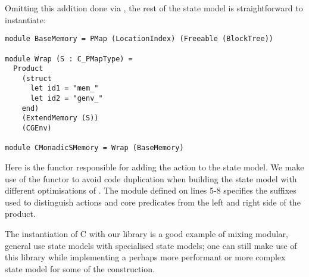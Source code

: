 Omitting this addition done via , the rest of the state model is straightforward to instantiate: \begin{lstlisting}
module BaseMemory = PMap (LocationIndex) (Freeable (BlockTree))

module Wrap (S : C_PMapType) =
  Product
    (struct
      let id1 = "mem_"
      let id2 = "genv_"
    end)
    (ExtendMemory (S))
    (CGEnv)

module CMonadicSMemory = Wrap (BaseMemory)
\end{lstlisting}
Here  is the functor responsible for adding the  action to the state model. We make use of the  functor to avoid code duplication when building the state model with different optimisations of \PMap{}. The module defined on lines 5-8 specifies the suffixes used to distinguish actions and core predicates from the left and right side of the product.

The instantiation of C with our library is a good example of mixing modular, general use state models with specialised state models; one can still make use of this library while implementing a perhaps more performant or more complex state model for some of the construction.








